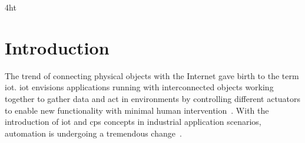 \documentclass[
a4paper,
twoside,
bibliography=totoc,
headsepline,
cleardoublepage=empty,
parskip=half,
draft=false
]{scrbook}
\begin{document}
	
	\listoffigures
	\listoftables
	
	
	
	\printnoidxglossaries
	
	\iftex4ht
	\else
	\fi
	
	
	\renewcommand*{\chapterpagestyle}{scrplain}
	\pagestyle{scrheadings}
	\pagestyle{scrheadings}
	\ihead[]{}
	\chead[]{}
	\ohead[]{\headmark}
	\cfoot[]{}
	\ifoot[]{}

	
	\chapter{Introduction} \label{ch:introduction}
	
		
		The trend of connecting physical objects with the Internet gave birth to the term \gls{iot}. 
		\gls{iot} envisions applications running with interconnected objects working together to gather data and act in environments by controlling different actuators to enable new functionality with minimal human intervention~\cite{atzori2010internet}.
		With the introduction of \gls{iot} and \gls{cps} concepts in industrial application scenarios, automation is undergoing a tremendous change~\cite{wollschlaeger2017future}.
		
\end{document}
